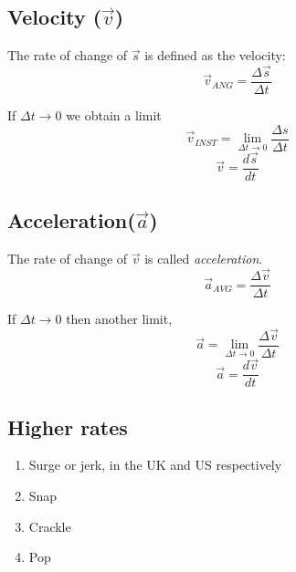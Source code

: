 \documentclass[letterpaper]{article}
\begin{document}
\subsection{Velocity ($\vec{v}$)}

The rate of change of $\vec{s}$ is defined as the velocity:
\[
    \vec{v}_{ANG} = \frac{\Delta{\vec{s}}}{\Delta{t}}
\]

If $\Delta{t} \rightarrow 0$ we obtain a limit
\[
    \vec{v}_{INST} = \lim_{\Delta{t} \rightarrow 0} {\frac{\Delta{s}}{\Delta{t}}}
\]
\[
    \vec{v} = \frac{d\vec{s}}{dt}
\]

\subsection{Acceleration($\vec{a}$)}

The rate of change of $\vec{v}$ is called {\em acceleration}.
\[
    \vec{a}_{AVG} = \frac{\Delta{\vec{v}}}{\Delta{t}}
\]

If $\Delta{t} \rightarrow 0$ then another limit,
\[
    \vec{a} = \lim_{\Delta{t} \rightarrow 0} {\frac{\Delta{\vec{v}}}{\Delta{t}}}
\]
\[
    \vec{a} = \frac{d\vec{v}}{dt}
\]

\subsection{Higher rates}
\begin{enumerate}
    \item Surge or jerk, in the UK and US respectively 
    \item Snap
    \item Crackle
    \item Pop
\end{enumerate}
\end{document}

